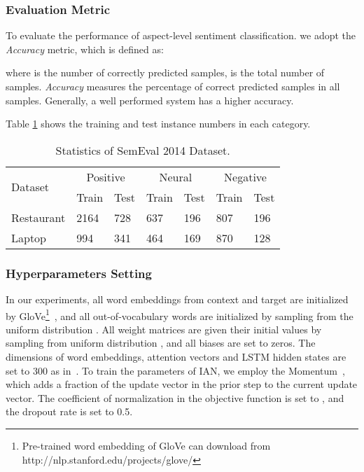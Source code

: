 \documentclass{article}
\begin{document}
\subsubsection*{Evaluation Metric} 
To evaluate the performance of aspect-level sentiment classification. we adopt the  \emph{Accuracy} metric, which is defined as:

where  is the number of correctly predicted samples,  is the total number of samples.
\emph{Accuracy} measures the percentage of correct predicted samples in all samples. Generally, a well performed system has a higher accuracy.

Table \ref{tab:stat} shows the  training and test instance numbers in each category.
\begin{table}[htb]
	\centering
	\begin{tabular}{|l|l|l|l|l|l|l|}
		\hline
		\multirow{2}{*}{Dataset} & \multicolumn{2}{c|}{Positive} & \multicolumn{2}{c|}{Neural} & \multicolumn{2}{c|}{Negative} \\ \cline{2-7} 
		& \multicolumn{1}{l|}{Train}    & \multicolumn{1}{l|}{Test}   & \multicolumn{1}{l|}{Train} 
		& \multicolumn{1}{l|}{Test}     & \multicolumn{1}{l|}{Train}  & \multicolumn{1}{l|}{Test} \\ \hline
		Restaurant              &2164                           &728                          &637                                     
		&196                            &807                          &196                        \\ \hline
		Laptop                  &994                            &341                          &464                                    
		&169                            &870                          &128                        \\ \hline
	\end{tabular}
	\caption{Statistics of SemEval 2014 Dataset.}
	\label{tab:stat}
\end{table}

\subsubsection*{Hyperparameters Setting}
In our experiments, all word embeddings from context and target are initialized by GloVe\footnote{Pre-trained word embedding of GloVe can download from http://nlp.stanford.edu/projects/glove/}~\cite{pennington2014glove}, and all out-of-vocabulary words are initialized by  sampling from the uniform distribution . All weight matrices are given their initial values by sampling from uniform distribution , and all biases are set to zeros.
The dimensions of word embeddings, attention vectors and LSTM hidden states are set to 300 as in~\cite{wang2016attention}.
To train the parameters of IAN, we employ the Momentum~\cite{qian1999momentum}, which adds a fraction  of the update vector in the prior step to the current update vector.
The coefficient of  normalization in the objective function is set to , and the dropout rate is set to 0.5.
\end{document}
